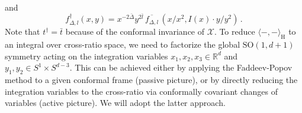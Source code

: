 \documentclass{article}
\def \Dg {\Delta}
\def \Rs {\mathbb{R}}
\begin{document}
and
\begin{equation}
    f_{\Dg,l}^{\dagger}(x,y) = x^{-2 \bar{\Dg}} y^{2\bar{l}} \,\overline{f_{\Dg,l}}\,(x/x^2, I(x) \cdot y/y^2 )\,.
\end{equation}
Note that $t^{\dagger} = \bar{t}$ because of the conformal invariance of $\mathcal{X}$. To reduce $\langle -,-\rangle_{\mathrm{H}}$ to an integral over cross-ratio space, we need to factorize the global $\mathrm{SO}(1,d+1)$ symmetry acting on the integration variables $x_1,x_2,x_3 \in \Rs^{d}$ and $y_1,y_2 \in S^1 \times S^{d-3}$. This can be achieved either by applying the Faddeev-Popov method to a given conformal frame (passive picture), or by directly reducing the integration variables to the cross-ratio via conformally covariant changes of variables (active picture). We will adopt the latter approach. 
\end{document}
